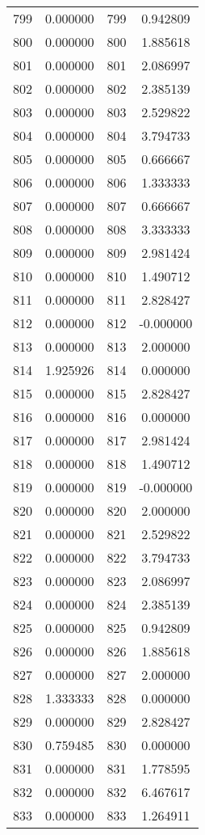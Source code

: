 \documentclass[12pt]{article}
\begin{document}
\begin{longtable}{@{}cccc@{}}
799 & 0.000000 & 799 & 0.942809 \\
800 & 0.000000 & 800 & 1.885618 \\
801 & 0.000000 & 801 & 2.086997 \\
802 & 0.000000 & 802 & 2.385139 \\
803 & 0.000000 & 803 & 2.529822 \\
804 & 0.000000 & 804 & 3.794733 \\
805 & 0.000000 & 805 & 0.666667 \\
806 & 0.000000 & 806 & 1.333333 \\
807 & 0.000000 & 807 & 0.666667 \\
808 & 0.000000 & 808 & 3.333333 \\
809 & 0.000000 & 809 & 2.981424 \\
810 & 0.000000 & 810 & 1.490712 \\
811 & 0.000000 & 811 & 2.828427 \\
812 & 0.000000 & 812 & -0.000000 \\
813 & 0.000000 & 813 & 2.000000 \\
814 & 1.925926 & 814 & 0.000000 \\
815 & 0.000000 & 815 & 2.828427 \\
816 & 0.000000 & 816 & 0.000000 \\
817 & 0.000000 & 817 & 2.981424 \\
818 & 0.000000 & 818 & 1.490712 \\
819 & 0.000000 & 819 & -0.000000 \\
820 & 0.000000 & 820 & 2.000000 \\
821 & 0.000000 & 821 & 2.529822 \\
822 & 0.000000 & 822 & 3.794733 \\
823 & 0.000000 & 823 & 2.086997 \\
824 & 0.000000 & 824 & 2.385139 \\
825 & 0.000000 & 825 & 0.942809 \\
826 & 0.000000 & 826 & 1.885618 \\
827 & 0.000000 & 827 & 2.000000 \\
828 & 1.333333 & 828 & 0.000000 \\
829 & 0.000000 & 829 & 2.828427 \\
830 & 0.759485 & 830 & 0.000000 \\
831 & 0.000000 & 831 & 1.778595 \\
832 & 0.000000 & 832 & 6.467617 \\
833 & 0.000000 & 833 & 1.264911 \\

\end{longtable}
\end{document}
